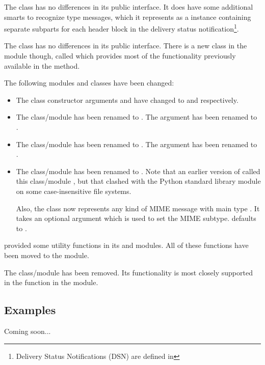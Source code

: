 The  class has no differences in its public interface.
It does have some additional smarts to recognize
 type messages, which it represents as
a  instance containing separate 
subparts for each header block in the delivery status
notification\footnote{Delivery Status Notifications (DSN) are defined
in }.

The  class has no differences in its public
interface.  There is a new class in the 
module though, called  which provides most of
the functionality previously available in the
 method.

The following modules and classes have been changed:

\begin{itemize}
\item The  class constructor arguments 
      and  have changed to  and
       respectively.
\item The  class/module has been renamed to
      .  The  argument has been renamed to
      .
\item The  class/module has been renamed to
      .  The  argument has been renamed to
      .
\item The  class/module has been renamed to
      .  Note that an earlier version of
       called this class/module , but
      that clashed with the Python standard library module
       on some case-insensitive file systems.

      Also, the  class now represents any kind of
      MIME message with main type .  It takes an
      optional argument  which is used to set the MIME
      subtype.   defaults to .
\end{itemize}

 provided some utility functions in its
 and  modules.  All of these functions
have been moved to the  module.

The  class/module has been removed.  Its functionality
is most closely supported in the 
function in the  module.

\subsection{Examples}

Coming soon...

